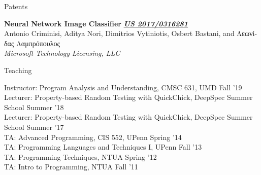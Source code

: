 \documentclass{resume} %
\begin{document}

\begin{rSection}{Patents}

{\bf Neural Network Image Classifier} \hfill {\href{https://patentimages.storage.googleapis.com/44/ec/9f/3f90c94a602fda/US20170316281A1.pdf}{\bf \em US 2017/0316281}}\\
Antonio Criminisi, Aditya Nori, Dimitrios Vytiniotis, Osbert Bastani, \textgreek{and} \textgreek{Λεωνίδας Λαμπρόπουλος}\\
{\em Microsoft Technology Licensing, LLC}

  
\end{rSection}


\newcommand{\teach}[3]{
  {#1: #2} \hfill #3 \\
  }

\begin{rSection}{Teaching}

  \teach{Instructor}{Program Analysis and Understanding, CMSC 631, UMD}{Fall '19}
  \teach{Lecturer}{Property-based Random Testing with QuickChick, DeepSpec Summer School}{Summer '18}
  \teach{Lecturer}{Property-based Random Testing with QuickChick, DeepSpec Summer School}{Summer '17}  
  \teach{TA}{Advanced Programming, CIS 552, UPenn}{Spring '14}
  \teach{TA}{Programming Languages and Techniques I, UPenn}{Fall '13}
  \teach{TA}{Programming Techniques, NTUA}{Spring '12}
  \teach{TA}{Intro to Programming, NTUA}{Fall '11}
\end{rSection}



\newcommand{\talk}[3]{
  {\bf #1} \\ %
  {#3}
  }

\newcommand{\apls}[1]{Athens PL Seminar, NTUA, #1}
\end{document}
